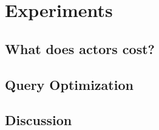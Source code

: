 
\section{Experiments}\label{sec:experiments}

\subsection{What does actors cost?}

\subsection{Query Optimization}

\subsection{Discussion}
